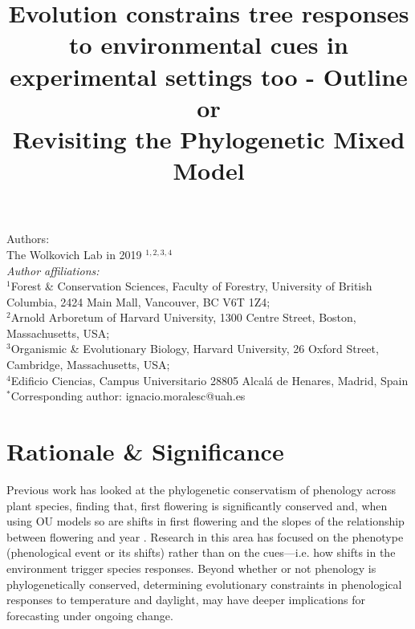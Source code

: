\documentclass{article}\usepackage[]{graphicx}\usepackage[]{color}
\title{Evolution constrains tree responses to environmental cues in experimental settings too - Outline\\
			or\\
			Revisiting the Phylogenetic Mixed Model}
\begin{document}
\maketitle

\noindent Authors:\\
The Wolkovich Lab in 2019 $^{1,2,3,4}$
\vspace{2ex}\\
\emph{Author affiliations:}\\
$^{1}$Forest \& Conservation Sciences, Faculty of Forestry, University of British Columbia, 2424 Main Mall, Vancouver, BC V6T 1Z4;\\
$^{2}$Arnold Arboretum of Harvard University, 1300 Centre Street, Boston, Massachusetts, USA;\\
$^{3}$Organismic \& Evolutionary Biology, Harvard University, 26 Oxford Street, Cambridge, Massachusetts, USA;\\
$^{4}$Edificio Ciencias, Campus Universitario 28805 Alcalá de Henares, Madrid, Spain\\
 

\vspace{2ex}
$^*$Corresponding author: ignacio.moralesc@uah.es\\
\renewcommand{\thetable}{\arabic{table}}
\renewcommand{\thefigure}{\arabic{figure}}
\renewcommand{\labelitemi}{$-$}

\clearpage
\section*{Rationale \& Significance}

Previous work has looked at the phylogenetic conservatism of phenology across plant species, finding that, first flowering is significantly conserved \citep{davies2013phylogenetic} and, when using OU models so are shifts in first flowering and the slopes of the relationship between flowering and year \citep{rafferty2017global}. Research in this area has focused on the phenotype (phenological event or its shifts) rather than on the cues---i.e. how shifts in the environment trigger species responses. Beyond whether or not phenology is phylogenetically conserved, determining evolutionary constraints in phenological responses to temperature and daylight, may have deeper implications for forecasting under ongoing change.\\ 
\end{document}

